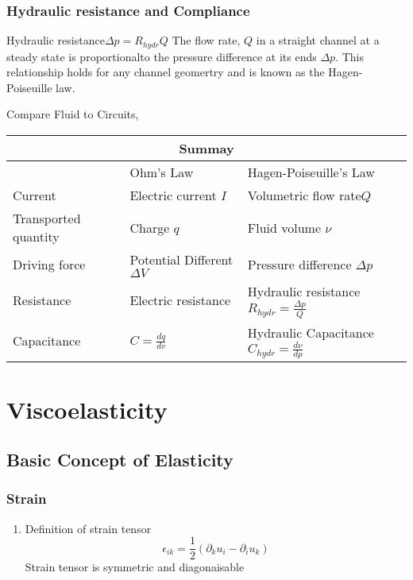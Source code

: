 \documentclass[12pt,a4paper]{article}
\begin{document}
        \subsubsection{Hydraulic resistance and Compliance}
            \begin{definition}
                {Hydraulic resistance}{$\Delta p = R_{hydr}Q$}
                {
                    The flow rate, $Q$ in a straight channel at a steady state is proportionalto the pressure difference at its ends $\Delta p$. This relationship holds for any channel geomertry and is known as the Hagen-Poiseuille law.
                }
            \end{definition}
            Compare Fluid to Circuits,\\
            \begin{tabular}{ p{5cm}p{5cm}p{7cm}  }
                \hline
                \multicolumn{3}{c}{Summay} \\
                \hline
                                & Ohm's Law&Hagen-Poiseuille's Law\\
                Current & Electric current $I$  & Volumetric flow rate$Q$\\
                Transported quantity    & Charge $q$    & Fluid volume $\nu$\\
                Driving force & Potential Different $\Delta V$ & Pressure  difference $\Delta p$\\
                Resistance& Electric resistance     &Hydraulic resistance $R_{hydr}=\frac{\Delta p}{Q}$\\
                Capacitance & $C=\frac{dq}{dv}$ & Hydraulic Capacitance $C_{hydr}=\frac{d\nu}{dp}$\\
                \hline
               \end{tabular}
        

            
            
\section{Viscoelasticity}
\subsection{Basic Concept of Elasticity}
    \subsubsection{Strain}
        \begin{enumerate}
            \item Definition of strain tensor
            \begin{equation}
                \epsilon_{ik}= \dfrac{1}{2}(\partial_{k}u_i-\partial_{i}u_k)
            \end{equation}
            Strain tensor is symmetric and diagonaisable
        \end{enumerate}
\end{document}
